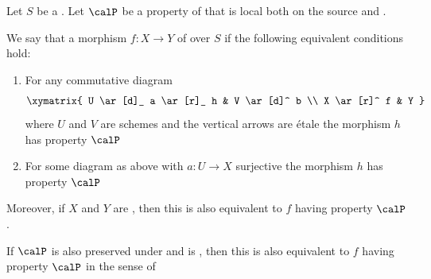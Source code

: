 \begin{definition} \label{definition:property_of_morphism_of_algebraic_spaces_coming_from_a_property_of_morphisms_of_schemes_etale_local_on_source_and_target}
    Let $S$ be a . Let $\calP$ be a property of  that is  local both on the source and .

    We say that a morphism $f: X \to Y$ of  over $S$  if the following equivalent conditions hold:
    \begin{enumerate}
        \item For any commutative diagram
        $$\xymatrix{ U \ar[d]_ a \ar[r]_ h &  V \ar[d]^ b \\  X \ar[r]^ f &  Y }$$
        where $U$ and $V$ are schemes and the vertical arrows are \'etale the morphism $h$ has property $\calP$ 

        \item For some diagram as above with $a: U \to X$ surjective the morphism $h$ has property $\calP$
    \end{enumerate}
    Moreover, if $X$ and $Y$ are , then this is also equivalent to $f$ having property $\calP$. 

    If $\calP$ is also preserved under  and is  , then this is also equivalent to $f$ having property $\calP$ in the sense of 
\end{definition}